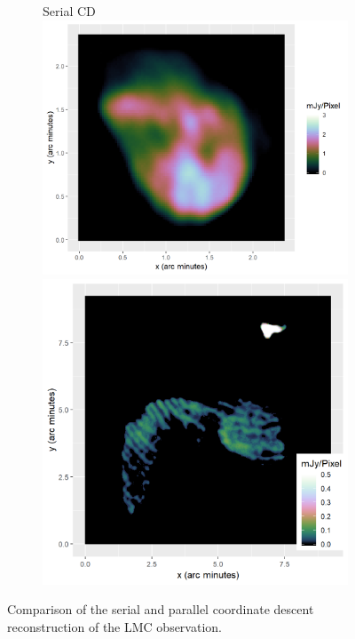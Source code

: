 \begin{figure}[h]
\begin{subfigure}{0.3\linewidth}
	\end{subfigure}
	\begin{subfigure}{0.3\linewidth}
		\centering
		Serial CD
		\includegraphics[width=1.0\linewidth]{./chapters/10.results/SerialCD/CD-N132.png}
		\\
		\includegraphics[width=1.0\linewidth]{./chapters/10.results/pcdm/CD-Calibration-Comp.png}
	\end{subfigure}
	
	\caption{Comparison of the serial and parallel coordinate descent reconstruction of the LMC observation.}
	\label{pcdm:comparison:figure}
\end{figure}

